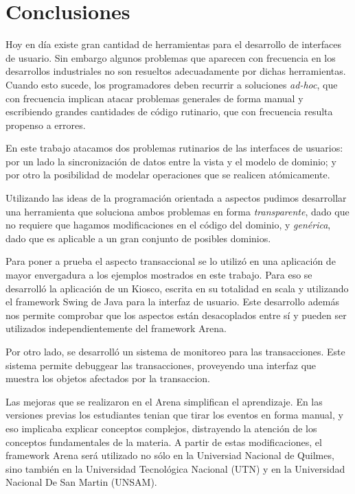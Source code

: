 \section{Conclusiones}
\label{conclusions}
Hoy en día existe gran cantidad de herramientas para el
desarrollo de interfaces de usuario. Sin embargo algunos problemas que
aparecen con frecuencia en los desarrollos industriales no son resueltos
adecuadamente por dichas herramientas.
 Cuando esto sucede, los programadores deben recurrir a soluciones
\emph{ad-hoc},  que con frecuencia implican atacar problemas generales de forma
manual y escribiendo grandes cantidades de código rutinario, que con
frecuencia resulta propenso a errores.

En este trabajo atacamos dos problemas rutinarios de las interfaces de usuarios:
por un lado la sincronización de datos entre la vista y el modelo de dominio; y
por otro la posibilidad de modelar operaciones que se realicen atómicamente.

Utilizando las ideas de la programación orientada a aspectos pudimos desarrollar
una herramienta que soluciona ambos problemas en forma \emph{transparente}, dado
que no requiere que hagamos modificaciones en el código del dominio, y \emph{genérica},
dado que es aplicable a un gran conjunto de posibles dominios.

\medskip

Para poner a prueba el aspecto transaccional se lo utilizó en una aplicación de
mayor envergadura a los ejemplos mostrados en este trabajo.
Para eso se desarrolló la aplicación de un Kiosco, escrita en su totalidad en
scala y utilizando el framework Swing de Java para la interfaz de usuario.
Este desarrollo además nos permite comprobar que los aspectos están desacoplados
entre sí y pueden ser utilizados independientemente del framework Arena.


Por otro lado, se desarrolló un sistema de monitoreo para las transacciones.
Este sistema permite debuggear las transacciones, proveyendo una interfaz que muestra los
objetos afectados por la transaccion.


Las mejoras que se realizaron en el Arena simplifican el aprendizaje.
En las versiones previas los estudiantes tenian que tirar los eventos en forma
manual, y eso implicaba explicar conceptos complejos, distrayendo la atención de
los conceptos fundamentales de la materia.
A partir de estas modificaciones, el framework Arena será utilizado no
sólo en la Universiad Nacional de Quilmes, sino también en la Universidad
Tecnológica Nacional (UTN) y en la Universidad Nacional De San Martin (UNSAM).

